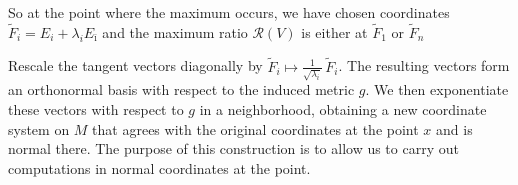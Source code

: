 \documentclass[12pt,letterpaper]{amsart}%
\newcounter{mycounter}
\numberwithin{mycounter}{section}
\theoremstyle{plain}
\newtheorem{lemma}[mycounter]{Lemma}
\numberwithin{equation}{section}
\theoremstyle{definition}
\begin{document}

So at the point where the maximum occurs, we have chosen coordinates $
\widetilde{F}_{i}=E_{i}+\lambda _{i}E_{\bar{\imath}}$ and the maximum ratio $\mathcal{R}%
(V)$ is either at $\widetilde{F}_{1}$ or $\widetilde{F}_{n}$


Rescale the tangent vectors diagonally by
$\widetilde{F}_i \mapsto \frac{1}{\sqrt{\lambda_i}}\,\widetilde{F}_i$. 
The resulting vectors form an orthonormal basis with respect to the induced metric $g$. We then exponentiate these vectors with respect to $g$ in a neighborhood, obtaining a new coordinate system on $M$ that agrees with the original coordinates at the point 
$x$ and is normal there. The purpose of this construction is to allow us to carry out computations in normal coordinates at the point.
\end{document}
